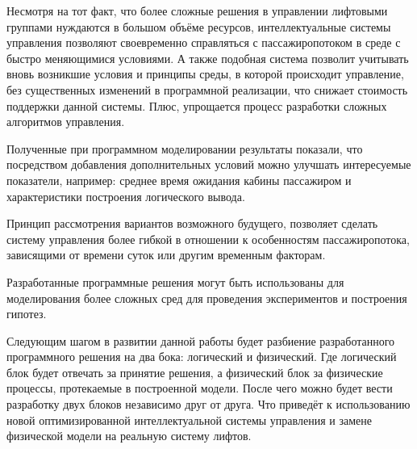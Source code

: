 
	Несмотря на тот факт, что более сложные решения в управлении лифтовыми группами нуждаются в большом объёме ресурсов,
		интеллектуальные системы управления позволяют своевременно справляться с пассажиропотоком в среде с быстро
		меняющимися условиями. А также подобная система позволит учитывать вновь возникшие условия и принципы
		среды, в которой происходит управление, без существенных изменений в программной реализации, что снижает
		стоимость поддержки данной системы. Плюс, упрощается процесс разработки сложных алгоритмов управления.

	Полученные при программном моделировании результаты показали, что посредством добавления дополнительных условий
		можно улучшать интересуемые показатели, например: среднее время ожидания кабины пассажиром и
		характеристики построения логического вывода.

	Принцип рассмотрения вариантов возможного будущего, позволяет сделать систему управления более гибкой в отношении к
		особенностям пассажиропотока, зависящими от времени суток или другим временным факторам.

	Разработанные программные решения могут быть использованы для моделирования более сложных сред для проведения
		экспериментов и построения гипотез.

	Следующим шагом в развитии данной работы будет разбиение разработанного программного решения на два бока: логический и
		физический. Где логический блок будет отвечать за принятие решения, а физический блок за физические процессы,
		протекаемые в построенной модели. После чего можно будет вести разработку двух блоков независимо друг от друга.
		Что приведёт к использованию новой оптимизированной интеллектуальной системы управления и замене физической
		модели на реальную систему лифтов.
